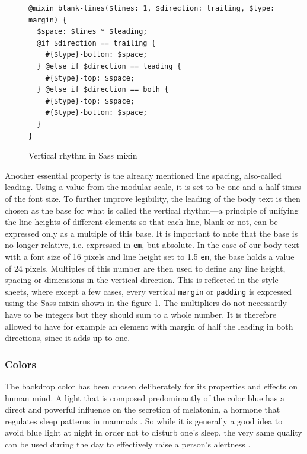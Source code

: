 \documentclass[thesis=M,english,hidelinks]{FITthesis}[2012/10/20]
\newcommand{\code}{\texttt}
\begin{document}
\begin{figure}[h]
  \begin{lstlisting}
@mixin blank-lines($lines: 1, $direction: trailing, $type: margin) {
  $space: $lines * $leading;
  @if $direction == trailing {
    #{$type}-bottom: $space;
  } @else if $direction == leading {
    #{$type}-top: $space;
  } @else if $direction == both {
    #{$type}-top: $space;
    #{$type}-bottom: $space;
  }
}
  \end{lstlisting}
  \caption{Vertical rhythm in Sass mixin}
  \label{fig:vertical_rhythm_mixin}
\end{figure}

Another essential property is the already mentioned line spacing, also-called leading. Using a value from the modular scale, it is set to be one and a half times of the font size. To further improve legibility, the leading of the body text is then chosen as the base for what is called the vertical rhythm---a principle of unifying the line heights of different elements so that each line, blank or not, can be expressed only as a multiple of this base. It is important to note that the base is no longer relative, i.e. expressed in \code{em}, but absolute. In the case of our body text with a font size of 16 pixels and line height set to 1.5 \code{em}, the base holds a value of 24 pixels. Multiples of this number are then used to define any line height, spacing or dimensions in the vertical direction. This is reflected in the style sheets, where except a few cases, every vertical \code{margin} or \code{padding} is expressed using the Sass mixin shown in the figure \ref{fig:vertical_rhythm_mixin}. The multipliers do not necessarily have to be integers but they should sum to a whole number. It is therefore allowed to have for example an element with margin of half the leading in both directions, since it adds up to one.

    \subsubsection{Colors}

The backdrop color has been chosen deliberately for its properties and effects on human mind. A light that is composed predominantly of the color blue has a direct and powerful influence on the secretion of melatonin, a hormone that regulates sleep patterns in mammals \cite{revell}. So while it is generally a good idea to avoid blue light at night in order not to disturb one's sleep, the very same quality can be used during the day to effectively raise a person's alertness \cite{viola}.
\end{document}
